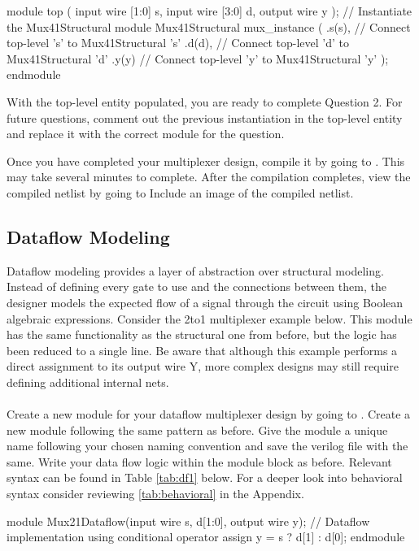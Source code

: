 \documentclass[12pt]{labmanual}
\begin{document}
\begin{codeblock}[language=verilog]
module top (
    input wire [1:0] s,
    input wire [3:0] d,
    output wire y
);
    // Instantiate the Mux41Structural module
    Mux41Structural mux_instance (
        .s(s),  // Connect top-level 's' to Mux41Structural 's'
        .d(d),  // Connect top-level 'd' to Mux41Structural 'd'
        .y(y)   // Connect top-level 'y' to Mux41Structural 'y'
    );
endmodule
\end{codeblock}

With the top-level entity populated, you are ready to complete Question 2. For future questions, comment out the previous instantiation in the top-level entity and replace it with the correct module for the question.

\begin{question}
    Once you have completed your multiplexer design, compile it by going to . This may take several minutes to complete. After the compilation completes, view the compiled netlist by going to  Include an image of the compiled netlist.
\end{question}

\clearpage
\subsection{Dataflow Modeling}
\label{sec:mux-dataflow}
Dataflow modeling provides a layer of abstraction over structural modeling. Instead of defining every gate to use and the connections between them, the designer models the expected flow of a signal through the circuit using Boolean algebraic expressions. Consider the 2to1 multiplexer example below. This module has the same functionality as the structural one from before, but the logic has been reduced to a single line. Be aware that although this example performs a direct assignment to its output wire Y, more complex designs may still require defining additional internal nets. \\
\\
Create a new module for your dataflow multiplexer design by going to . Create a new module following the same pattern as before. Give the module a unique name following your chosen naming convention and save the verilog file with the same. Write your data flow logic within the module block as before. Relevant syntax can be found in Table \ref{tab:df1} below. For a deeper look into behavioral syntax consider reviewing \vref{tab:behavioral} in the Appendix.
\\
\begin{codeblock}[language=verilog]
module Mux21Dataflow(input wire s, d[1:0], output wire y);
  // Dataflow implementation using conditional operator
  assign y = s ? d[1] : d[0];
endmodule
\end{codeblock}
\end{document}
